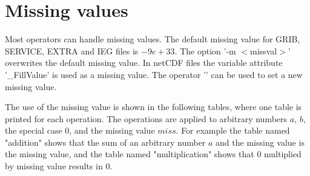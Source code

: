 \section{Missing values}

Most operators can handle missing values.
The default missing value for GRIB, SERVICE, EXTRA and IEG files is $-9e+33$. 
The {\CDO} option '-m $<$missval$>$' overwrites the default missing value.
In netCDF files the variable attribute '\_FillValue' is used as a missing value.
The operator '' can be used to set a new missing value.

The {\CDO} use of the missing value is shown in the following tables,
where one table is printed for each operation.
The operations are applied to arbitrary numbers $a$, $b$, the special case $0$,
and the missing value $miss$.
For example the table named "addition" shows that the sum of an
arbitrary number $a$ and the missing value is the missing value,
and the table named "multiplication" shows that $0$ multiplied by missing
value results in $0$.


